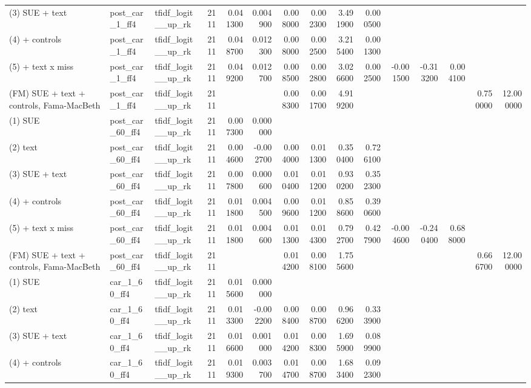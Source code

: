 \begin{table}
\begin{tabular}{lllrrrrrrrrrrrr}
(3) SUE + text & post\_car\_1\_ff4 & tfidf\_logit\_\_up\_rk & 2111 & 0.041300 & 0.004900 & 0.008000 & 0.002300 & 3.491900 & 0.000500 &  &  &  &  &  \\
(4) + controls & post\_car\_1\_ff4 & tfidf\_logit\_\_up\_rk & 2111 & 0.048700 & 0.012300 & 0.008000 & 0.002500 & 3.215400 & 0.001300 &  &  &  &  &  \\
(5) + text x miss & post\_car\_1\_ff4 & tfidf\_logit\_\_up\_rk & 2111 & 0.049200 & 0.012700 & 0.008500 & 0.002800 & 3.026600 & 0.002500 & -0.001500 & -0.313200 & 0.004100 &  &  \\
(FM) SUE + text + controls, Fama-MacBeth & post\_car\_1\_ff4 & tfidf\_logit\_\_up\_rk & 2111 &  &  & 0.008300 & 0.001700 & 4.919200 &  &  &  &  & 0.750000 & 12.000000 \\
(1) SUE & post\_car\_60\_ff4 & tfidf\_logit\_\_up\_rk & 2111 & 0.007300 & 0.000000 &  &  &  &  &  &  &  &  &  \\
(2) text & post\_car\_60\_ff4 & tfidf\_logit\_\_up\_rk & 2111 & 0.004600 & -0.002700 & 0.004000 & 0.011300 & 0.350400 & 0.726100 &  &  &  &  &  \\
(3) SUE + text & post\_car\_60\_ff4 & tfidf\_logit\_\_up\_rk & 2111 & 0.007800 & 0.000600 & 0.010400 & 0.011200 & 0.930200 & 0.352300 &  &  &  &  &  \\
(4) + controls & post\_car\_60\_ff4 & tfidf\_logit\_\_up\_rk & 2111 & 0.011800 & 0.004500 & 0.009600 & 0.011200 & 0.858600 & 0.390600 &  &  &  &  &  \\
(5) + text x miss & post\_car\_60\_ff4 & tfidf\_logit\_\_up\_rk & 2111 & 0.011800 & 0.004600 & 0.011300 & 0.014300 & 0.792700 & 0.427900 & -0.004600 & -0.240400 & 0.688000 &  &  \\
(FM) SUE + text + controls, Fama-MacBeth & post\_car\_60\_ff4 & tfidf\_logit\_\_up\_rk & 2111 &  &  & 0.014200 & 0.008100 & 1.755600 &  &  &  &  & 0.666700 & 12.000000 \\
(1) SUE & car\_1\_60\_ff4 & tfidf\_logit\_\_up\_rk & 2111 & 0.015600 & 0.000000 &  &  &  &  &  &  &  &  &  \\
(2) text & car\_1\_60\_ff4 & tfidf\_logit\_\_up\_rk & 2111 & 0.013300 & -0.002200 & 0.008400 & 0.008700 & 0.966200 & 0.333900 &  &  &  &  &  \\
(3) SUE + text & car\_1\_60\_ff4 & tfidf\_logit\_\_up\_rk & 2111 & 0.016600 & 0.001000 & 0.014200 & 0.008300 & 1.695900 & 0.089900 &  &  &  &  &  \\
(4) + controls & car\_1\_60\_ff4 & tfidf\_logit\_\_up\_rk & 2111 & 0.019300 & 0.003700 & 0.014700 & 0.008700 & 1.683400 & 0.092300 &  &  &  &  &  \\

\end{tabular}
\end{table}
